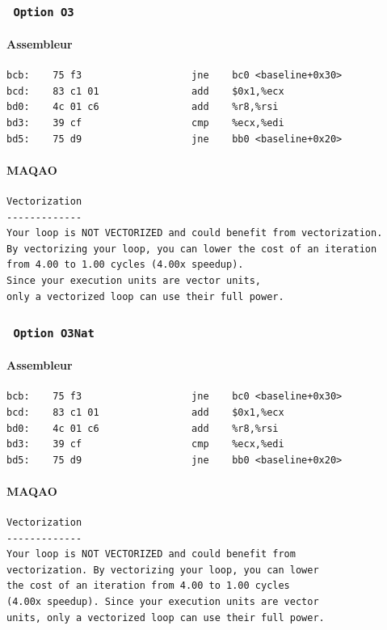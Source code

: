 \documentclass{report}
\begin{document}
      \subsubsection{ \texttt{ Option O3 }  }
      \paragraph{Assembleur}
        \begin{tcolorbox}
          \begin{verbatim}
bcb:	75 f3                	jne    bc0 <baseline+0x30>
bcd:	83 c1 01             	add    $0x1,%ecx
bd0:	4c 01 c6             	add    %r8,%rsi
bd3:	39 cf                	cmp    %ecx,%edi
bd5:	75 d9                	jne    bb0 <baseline+0x20>
        \end{verbatim}
      \end{tcolorbox}
      \paragraph{MAQAO}
        \begin{tcolorbox}
          \begin{verbatim}
Vectorization
-------------
Your loop is NOT VECTORIZED and could benefit from vectorization.
By vectorizing your loop, you can lower the cost of an iteration
from 4.00 to 1.00 cycles (4.00x speedup).
Since your execution units are vector units,
only a vectorized loop can use their full power.
        \end{verbatim}
      \end{tcolorbox}
      \subsubsection{ \texttt{ Option O3Nat} }
      \paragraph{Assembleur}
        \begin{tcolorbox}
          \begin{verbatim}
bcb:	75 f3                	jne    bc0 <baseline+0x30>
bcd:	83 c1 01             	add    $0x1,%ecx
bd0:	4c 01 c6             	add    %r8,%rsi
bd3:	39 cf                	cmp    %ecx,%edi
bd5:	75 d9                	jne    bb0 <baseline+0x20>
        \end{verbatim}
      \end{tcolorbox}
      \paragraph{MAQAO}
        \begin{tcolorbox}
          \begin{verbatim}
Vectorization
-------------
Your loop is NOT VECTORIZED and could benefit from
vectorization. By vectorizing your loop, you can lower
the cost of an iteration from 4.00 to 1.00 cycles
(4.00x speedup). Since your execution units are vector
units, only a vectorized loop can use their full power.
        \end{verbatim}
      \end{tcolorbox}
\end{document}
